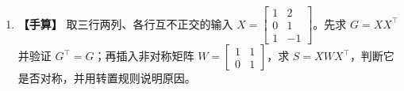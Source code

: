 \begin{enumerate}[label={},leftmargin=4.8em,itemsep=4pt]
\item[\textbf{C-033.}] \leavevmode{}\label{exercise:C-033}\label{exercise:gram-asymmetry}\textbf{【手算】} 取三行两列、各行互不正交的输入 $X=\begin{bmatrix}1&2\\0&1\\1&-1\end{bmatrix}$。先求 $G=XX^\top$ 并验证 $G^\top=G$；再插入非对称矩阵 $W=\begin{bmatrix}1&1\\0&1\end{bmatrix}$，求 $S=XWX^\top$，判断它是否对称，并用转置规则说明原因。
\end{enumerate}
